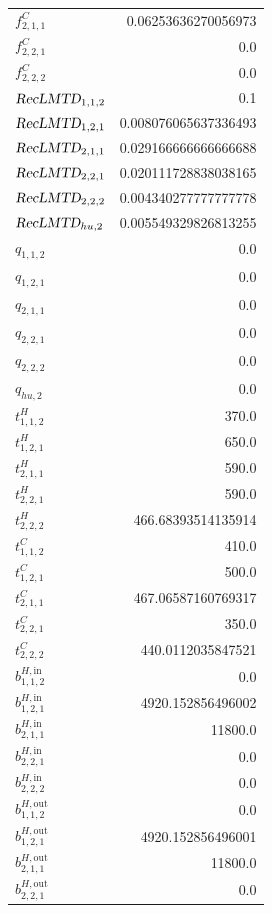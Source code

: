 \documentclass{article}%
\begin{document}
\begin{multicols*}{3}
\begin{supertabular}{lr}
	$f_{2,1,1}^{C}$ & 0.06253636270056973 \\%
	$f_{2,2,1}^{C}$ & 0.0 \\%
	$f_{2,2,2}^{C}$ & 0.0 \\%
	$\textsl{RecLMTD}_{1,1,2}$ & 0.1 \\%
	$\textsl{RecLMTD}_{1,2,1}$ & 0.008076065637336493 \\%
	$\textsl{RecLMTD}_{2,1,1}$ & 0.029166666666666688 \\%
	$\textsl{RecLMTD}_{2,2,1}$ & 0.020111728838038165 \\%
	$\textsl{RecLMTD}_{2,2,2}$ & 0.004340277777777778 \\%
	$\textsl{RecLMTD}_{hu,2}$ & 0.005549329826813255 \\%
	$q_{1,1,2}$ & 0.0 \\%
	$q_{1,2,1}$ & 0.0 \\%
	$q_{2,1,1}$ & 0.0 \\%
	$q_{2,2,1}$ & 0.0 \\%
	$q_{2,2,2}$ & 0.0 \\%
	$q_{hu,2}$ & 0.0 \\%
	$t_{1,1,2}^{H}$ & 370.0 \\%
	$t_{1,2,1}^{H}$ & 650.0 \\%
	$t_{2,1,1}^{H}$ & 590.0 \\%
	$t_{2,2,1}^{H}$ & 590.0 \\%
	$t_{2,2,2}^{H}$ & 466.68393514135914 \\%
	$t_{1,1,2}^{C}$ & 410.0 \\%
	$t_{1,2,1}^{C}$ & 500.0 \\%
	$t_{2,1,1}^{C}$ & 467.06587160769317 \\%
	$t_{2,2,1}^{C}$ & 350.0 \\%
	$t_{2,2,2}^{C}$ & 440.0112035847521 \\%
	$b_{1,1,2}^{H,\text{in}}$ & 0.0 \\%
	$b_{1,2,1}^{H,\text{in}}$ & 4920.152856496002 \\%
	$b_{2,1,1}^{H,\text{in}}$ & 11800.0 \\%
	$b_{2,2,1}^{H,\text{in}}$ & 0.0 \\%
	$b_{2,2,2}^{H,\text{in}}$ & 0.0 \\%
	$b_{1,1,2}^{H,\text{out}}$ & 0.0 \\%
	$b_{1,2,1}^{H,\text{out}}$ & 4920.152856496001 \\%
	$b_{2,1,1}^{H,\text{out}}$ & 11800.0 \\%
	$b_{2,2,1}^{H,\text{out}}$ & 0.0 \\%

\end{supertabular}
\end{multicols*}
\end{document}
